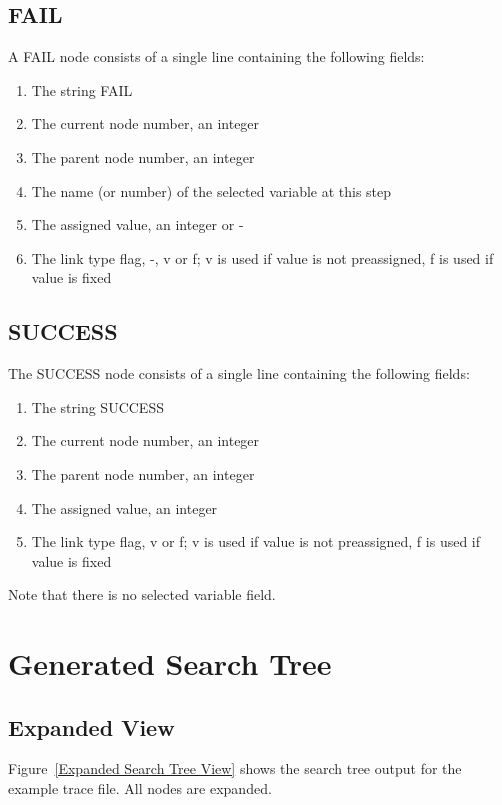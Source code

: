 \documentclass[a4paper]{article}
\begin{document}
\subsection{FAIL}

A FAIL node consists of a single line containing the following fields:

\begin{enumerate}
\item The string FAIL
\item The current node number, an integer
\item The parent node number, an integer
\item The name (or number) of the selected variable at this step 
\item The assigned value, an integer or -
\item The link type flag, -, v or f; v is used if value is not preassigned, f is used if value is fixed 

\end{enumerate}

\subsection{SUCCESS}

The SUCCESS node consists of a single line containing the following fields:
\begin{enumerate}
\item The string SUCCESS
\item The current node number, an integer
\item The parent node number, an integer
\item The assigned value, an integer
\item The link type flag, v or f; v is used if value is not preassigned, f is used if value is fixed 
\end{enumerate}

Note that there is no selected variable field.

\section{Generated Search Tree}
\subsection{Expanded View}
Figure~\ref{Expanded Search Tree View} shows the search tree output for the example trace file. All nodes are expanded.
\end{document}

